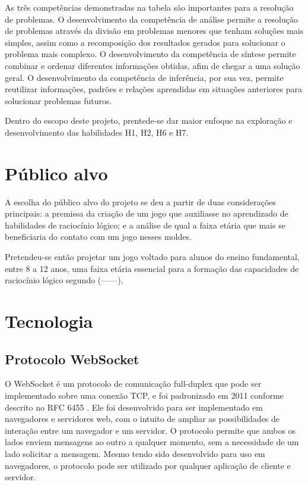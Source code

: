As três competências demonstradas na tabela são importantes para a resolução de problemas. O desenvolvimento da competência de análise permite a resolução de problemas através da divisão em problemas menores que tenham soluções mais simples, assim como a recomposição dos resultados gerados para solucionar o problema mais complexo. O desenvolvimento da competência de síntese permite combinar e ordenar diferentes informações obtidas, afim de chegar a uma solução geral. O desenvolvimento da competência de inferência, por sua vez, permite reutilizar informações, padrões e relações aprendidas em situações anteriores para solucionar problemas futuros.

Dentro do escopo deste projeto, prentede-se dar maior enfoque na exploração e desenvolvimento das habilidades H1, H2, H6 e H7.

\section{Público alvo}\label{sec-publico-alvo}

A escolha do público alvo do projeto se deu a partir de duas considerações principais: a premissa da criação de um jogo que auxiliasse no aprendizado de habilidades de raciocínio lógico; e a análise de qual a faixa etária que mais se beneficiaria do contato com um jogo nesses moldes.

Pretendeu-se então projetar um jogo voltado para alunos do ensino fundamental, entre 8 a 12 anos, uma faixa etária essencial para a formação das capacidades de raciocínio lógico segundo (------).


\section{Tecnologia}\label{sec-tecnologia}

\subsection{Protocolo WebSocket}\label{subsec-teo-websocket}

O WebSocket é um protocolo de comunicação full-duplex que pode ser implementado sobre uma conexão TCP, e foi padronizado em 2011 conforme descrito no RFC 6455 \cite{RFC:2011:websocket}. Ele foi desenvolvido para ser implementado em navegadores e servidores web, com o intuito de ampliar as possibilidades de interação entre um navegador e um servidor. O protocolo permite que ambos os lados enviem mensagens ao outro a qualquer momento, sem a necessidade de um lado solicitar a mensagem. Mesmo tendo sido desenvolvido para uso em navegadores, o protocolo pode ser utilizado por qualquer aplicação de cliente e servidor.

